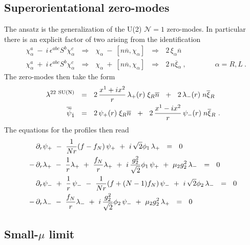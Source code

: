 \documentclass{article}
\newcommand{\p}{\partial}
\newcommand{\wt}{\widetilde}
\newcommand{\ov}{\overline}
\newcommand{\mc}[1]{\mathcal{#1}}
\begin{document}
\pagebreak
\subsection{Superorientational zero-modes}

The ansatz is the generalization of the U(2) $ \mc{N}=1 $ zero-modes. 
In particular there is an explicit factor of two arising from the identification
\begin{align*}
&	\chi_\alpha^a ~-~ i\,\epsilon^{abc} S^b \chi_\alpha^c  ~~~\Longrightarrow~~~ 
				\chi_\alpha ~-~ [ n\ov{n},\chi_\alpha ]
		~~~\Longrightarrow~~~  2\, \xi_\alpha \ov{n} 
	\\
&	\chi_\alpha^a ~+~ i\,\epsilon^{abc} S^b \chi_\alpha^c  ~~~\Longrightarrow~~~ 
				\chi_\alpha ~+~ [ n\ov{n},\chi_\alpha ]
		~~~\Longrightarrow~~~  2\, n\ov{\xi}{}_\alpha
	~,
	\qquad\qquad  \alpha=R,L~.
\end{align*}
The zero-modes then take the form
\begin{align*}
%
	\lambda^{22\ {\rm SU(N)}} & ~~=~~ 2\, \frac{x^1 + ix^2}{r}\, \lambda_+(r) \; \xi_R\ov{n}
				~~+~~  2\, \lambda_-(r)\; n\ov{\xi}{}_R
	\\
%
	\ov{\wt{\psi}}{}_{\dot{1}} & ~~=~~ 2\, \psi_+(r)\; \xi_R \ov{n} 
				~~+~~  2\, \frac{x^1 - i x^2}{r}\, \psi_-(r)\; n\ov{\xi}{}_R~.
\end{align*}
The equations for the profiles then read
\begin{align}
%
\notag
&
	\p_r \psi_+ ~-~ \frac{1}{Nr} (f-f_N)\, \psi_+ ~+~ i\,\sqrt{2}\phi_1\,\lambda_+ ~~=~~ 0
	\\
%
\notag
	-\, & \p_r\lambda_+ ~-~ \frac{1}{r}\lambda_+ ~+~ \frac{f_N}{r}\lambda_+ 
		~+~ i\,\frac{g_2^2}{\sqrt{2}}\phi_1\, \psi_+ ~+~ \mu_2 g_2^2\, \lambda_-  ~~=~~ 0
	\\
%
\label{N1_sorient_eqn}
&
	\p_r \psi_- ~+~ \frac{1}{r}\, \psi_- ~-~ \frac{1}{Nr}(f + (N-1)f_N)\, \psi_- 
							~+~ i\,\sqrt{2}\phi_2\, \lambda_- ~~=~~ 0
	\\
%
\notag
	-\, & \p_r\lambda_- ~-~ \frac{f_N}{r}\lambda_- ~+~ i\,\frac{g_2^2}{\sqrt{2}}\phi_2\, \psi_- 
								~+~ \mu_2 g_2^2\, \lambda_+ ~~=~~ 0
\end{align}

\pagebreak
\subsection{Small-$\mu$ limit}
\end{document}
